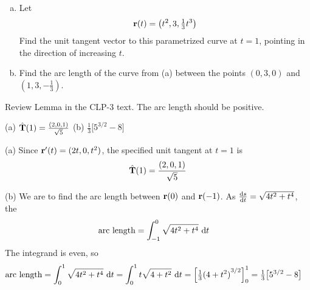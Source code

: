 \begin{question}[M317 2013D] %

\begin{enumerate}[(a)]
\item
Let
\begin{equation*}
\mathbf{r}(t) = \left(t^2 , 3, \tfrac{1}{3} t^3 \right) 
\end{equation*}
Find the unit tangent vector to this parametrized curve at $t = 1$, 
pointing in the direction of increasing $t$.
\item
Find the arc length of the curve from (a) between the points $(0, 3, 0)$ 
and $(1, 3, -\frac{1}{3})$.

\end{enumerate}
\end{question}

\begin{hint} 
Review Lemma  in the CLP-3 text.
The arc length should be positive.
\end{hint}

\begin{answer} 
(a) $\hat{\mathbf{T}}(1) = \frac{(2,0,1)}{\sqrt{5}}$\qquad
(b) $\frac{1}{3}\big[5^{3/2}-8\big]$
\end{answer}

\begin{solution} (a)
Since $\mathbf{r}'(t) = (2t,0,t^2)$, the specified unit tangent at $t=1$ is
\begin{equation*}
\hat{\mathbf{T}}(1) = \frac{(2,0,1)}{\sqrt{5}}
\end{equation*}

\noindent (b)
We are to find the arc length between $\mathbf{r}(0)$ and $\mathbf{r}(-1)$. 
As $\diff{s}{t}=\sqrt{4t^2+t^4}$, the 
\begin{align*}
\text{arc length} &= \int_{-1}^0 \sqrt{4t^2+t^4}\ \mathrm{d}t
\end{align*}
The integrand is even, so
\begin{align*}
\text{arc length} &= \int_0^1 \sqrt{4t^2+t^4}\ \mathrm{d}t
=\int_0^1 t\sqrt{4+t^2}\ \mathrm{d}t
=\Big[\tfrac{1}{3}{(4+t^2)}^{3/2}\Big]_0^1
=\tfrac{1}{3}\big[5^{3/2}-8\big]
\end{align*}

\end{solution}



